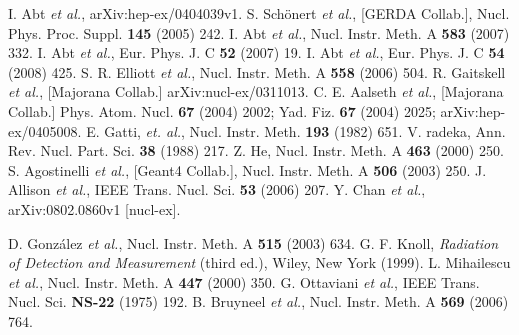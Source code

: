 \documentclass[epj]{svjour}
\begin{document}
%
\begin{thebibliography}{}
I. Abt \textit{et al.}, arXiv:hep-ex/0404039v1.
S. Sch\"onert \textit{et al.}, [GERDA Collab.],
Nucl. Phys. Proc. Suppl. \textbf{145} (2005) 242.
I. Abt \textit{et al.}, Nucl. Instr. Meth. A
\textbf{583} (2007) 332.
I. Abt \textit{et al.}, Eur. Phys. J. C \textbf{52}
(2007) 19.
I. Abt \textit{et al.}, Eur. Phys. J. C \textbf{54}
(2008) 425.
S. R. Elliott \textit{et al.}, Nucl. Instr. Meth. A
\textbf{558} (2006) 504.
R. Gaitskell \textit{et al.}, [Majorana Collab.]
arXiv:nucl-ex/0311013.
C. E. Aalseth \textit{et al.}, [Majorana Collab.]
Phys. Atom. Nucl. \textbf{67} (2004) 2002; Yad. Fiz. \textbf{67}
(2004) 2025; arXiv:hep-ex/0405008.
E. Gatti, \textit{et. al.},
Nucl. Instr. Meth. \textbf{193} (1982) 651.
V. radeka, Ann. Rev. Nucl. Part. Sci. \textbf{38}
(1988) 217.
Z. He, Nucl. Instr. Meth. A \textbf{463} (2000) 250.
S. Agostinelli \textit{et al.}, [Geant4 Collab.],
Nucl. Instr. Meth. A \textbf{506} (2003) 250.
J. Allison \textit{et al.}, IEEE
Trans. Nucl. Sci. \textbf{53} (2006) 207.
Y. Chan \textit{et al.}, arXiv:0802.0860v1 [nucl-ex].

D. Gonz\'alez \textit{et al.}, Nucl. Instr. Meth. A \textbf{515} (2003) 634.
G. F. Knoll, \textit{Radiation of Detection and Measurement} (third ed.), Wiley, New York (1999).
L. Mihailescu \textit{et al.}, Nucl. Instr. Meth. A \textbf{447} (2000) 350.
G. Ottaviani \textit{et al.}, IEEE Trans. Nucl. Sci. \textbf{NS-22} (1975) 192.
B. Bruyneel \textit{et al.}, Nucl. Instr. Meth. A \textbf{569} (2006) 764.%

\end{thebibliography}
%
\end{document}

